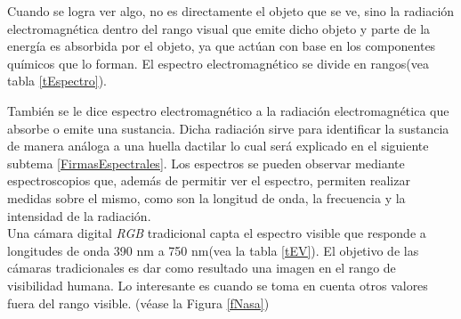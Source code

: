 Cuando se logra ver algo, no es directamente el objeto que se ve, sino la radiación electromagnética dentro del rango visual que emite dicho objeto y parte de la energía es absorbida por el objeto, ya que actúan con base en los componentes químicos que lo forman. El espectro electromagnético se divide en rangos(vea tabla \ref{tEspectro}).

También se le dice espectro electromagnético a la radiación electromagnética que absorbe o emite una sustancia. Dicha radiación sirve para identificar la sustancia de manera análoga a una huella dactilar lo cual será explicado en el siguiente subtema \ref{FirmasEspectrales}. Los espectros se pueden observar mediante espectroscopios que, además de permitir ver el espectro, permiten realizar medidas sobre el mismo, como son la longitud de onda, la frecuencia y la intensidad de la radiación.\\
Una cámara digital \textit{RGB} tradicional capta el espectro visible que responde a longitudes de onda 390 nm a 750 nm(vea la tabla \ref{tEV}). El objetivo de las cámaras tradicionales es dar como resultado una imagen en el rango de visibilidad humana. Lo interesante es cuando se toma en cuenta otros valores fuera del rango visible. (véase la Figura \ref{fNasa})

